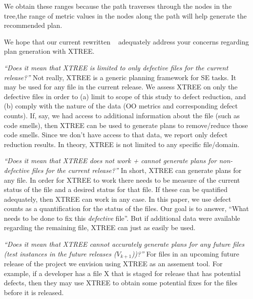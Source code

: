 We obtain these ranges because the path traverses through the nodes in the tree,the range of metric values in the nodes along the path will help generate the recommended plan. 

We hope that our current rewritten ~ adequately address your concerns regarding plan generation with XTREE. 


\bi[wide=0pt]
\item \textit{\enquote{Does it mean that XTREE is limited to only defective files for the current release?}} Not really, XTREE is a generic planning framework for SE tasks. It may be used for any file in the current release. We assess XTREE on only the defective files in order to (a) limit to scope of this study to defect reduction, and (b) comply with the nature of the data (OO metrics and corresponding defect counts). If, say, we had access to additional information about the file (such as code smells), then XTREE can be used to generate plans to remove/reduce those code smells. Since we don't have access to that data, we report only defect reduction results. In theory, XTREE is not limited to any specific file/domain.  
\item \textit{\enquote{Does it mean that XTREE does not work + cannot generate plans for non-defective files for the current release?}} In short, XTREE can generate plans for any file. In order for XTREE to work there needs to be measure of the current status of the file and a desired status for that file. If these can be quatified adequately, then XTREE can work in any case. In this paper, we use defect counts as a quantification for the status of the files. Our goal is to answer, ``What needs to be done to fix this \textit{defective} file''.  But if additional data were available regarding the remaining file, XTREE can just as easily be used. 
\item \textit{\enquote{Does it mean that XTREE cannot accurately generate plans for any future files (test instances in the future releases ($V_{k+1}$))?}} For files in an upcoming future release of the project we envision using XTREE as an assement tool. For example, if a developer has a file X that is staged for release that has potential defects, then they may use XTREE to obtain some potential fixes for the files before it is released.     
\ei

